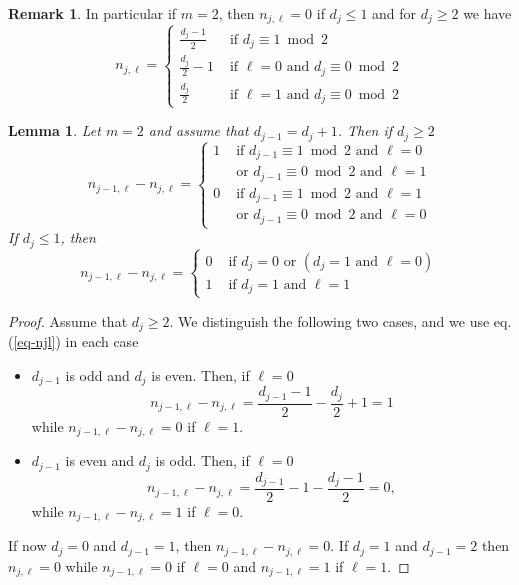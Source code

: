 \documentclass[11pt,letterpaper]{amsart}
\newtheorem{lemma}[theorem]{Lemma}
\theoremstyle{definition}
\newtheorem{remark}[theorem]{Remark}
\renewcommand{\mod}{\bmod}
\begin{document}
\begin{remark}
In particular if $m=2$, then $n_{j,\ell}=0$ if $d_j\leq 1$ and for $d_j \geq 2$ we have
\begin{equation}
\label{eq-njl}
n_{j,\ell}=
\begin{cases}
\frac{d_j-1}{2} & \text{ if } d_j \equiv 1 \mod 2
\\
\frac{d_j}{2}-1 & \text{ if } \ell=0 \text{ and } d_j \equiv 0 \mod 2
\\
\frac{d_j}{2} & \text{ if } \ell=1 \text{ and } d_j \equiv 0 \mod 2
\end{cases}
\end{equation}
\end{remark}
\begin{lemma}
\label{lemma:njl}
Let $m=2$ and assume that $d_{j-1}=d_j+1$. Then if $d_{j} \geq 2$
\[
  n_{j-1,\ell}-n_{j,\ell}=
  \begin{cases}
  1  & \text{ if } d_{j-1}\equiv 1 \mod2 \text{ and }  \ell=0
  \\
    &  \text{ or } d_{j-1}\equiv 0 \mod 2 \text{ and } \ell=1
  \\
  0  & \text{ if } d_{j-1}\equiv 1 \mod2 \text{ and }  \ell=1
  \\
    &  \text{ or } d_{j-1}\equiv 0 \mod 2 \text{ and } \ell= 0
  \end{cases}
\]
If $d_{j} \leq 1$, then
\[
  n_{j-1,\ell}-n_{j,\ell}=
  \begin{cases}
  0 & \text{ if } d_{j}=0 \text{ or } (d_j=1 \text{ and } \ell=0) \\
  1 & \text{ if } d_j=1 \text{ and } \ell=1
  \end{cases}
\] 
\end{lemma}
\begin{proof}
Assume that $d_j\geq 2$. 
We distinguish the following two cases, and we use eq. (\ref{eq-njl}) in each case
\begin{itemize}[leftmargin=10pt]
\item $d_{j-1}$ is odd and $d_{j}$ is even. Then, if $\ell=0$
\[
  n_{j-1,\ell}-n_{j,\ell}=\frac{d_{j-1}-1}{2}- \frac{d_{j}}{2}+1=1
\]
while $n_{j-1,\ell}-n_{j,\ell}=0$ if $\ell=1$. 
\item $d_{j-1}$ is even and $d_{j}$ is odd. Then, if $\ell=0$
\[
  n_{j-1,\ell}-n_{j,\ell}=\frac{d_{j-1}}{2}-1- \frac{d_{j}-1}{2}=0,
\]
while $n_{j-1,\ell}-n_{j,\ell}=1$ if $\ell=0$.
\end{itemize}
If now $d_j=0$ and $d_{j-1}=1$, then $n_{j-1,\ell}-n_{j,\ell}=0$. If $d_j=1$ and $d_{j-1}=2$ then $n_{j,\ell}=0$ while $n_{j-1,\ell}=0$ if $\ell=0$ and $n_{j-1,\ell}=1$ if $\ell=1$.
\end{proof}
\end{document}
